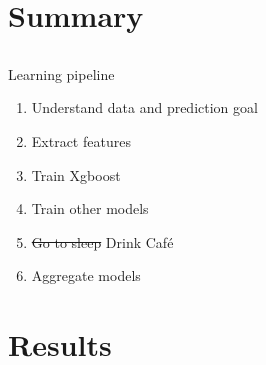\section{Summary} \subsection{}\label{}

\begin{frame}{Learning pipeline}
	
	\begin{enumerate}
		\item Understand data and prediction goal
		\item Extract features
		\item Train Xgboost
		\item Train other models
		\item \sout{Go to sleep} Drink Café 
		\item Aggregate models
	\end{enumerate}
	
		
\end{frame}


\section{Results} \subsection{}\label{}


